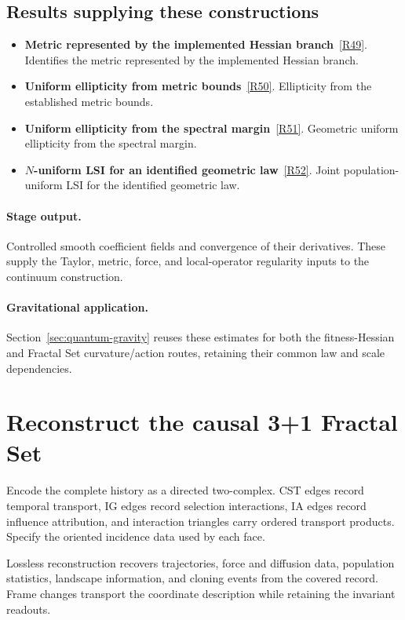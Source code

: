 \documentclass[11pt,a4paper]{article}
\begin{document}
\subsection*{Results supplying these constructions}
\begin{itemize}
\item \textbf{Metric represented by the implemented Hessian branch}~\hyperref[src:prop-geometry-clipped-metric]{[R49]}. Identifies the metric represented by the implemented Hessian branch.
\item \textbf{Uniform ellipticity from metric bounds}~\hyperref[src:thm-uniform-ellipticity-latent]{[R50]}. Ellipticity from the established metric bounds.
\item \textbf{Uniform ellipticity from the spectral margin}~\hyperref[src:thm-gg-ueph-construction]{[R51]}. Geometric uniform ellipticity from the spectral margin.
\item \textbf{\(N\)-uniform LSI for an identified geometric law}~\hyperref[src:thm-gg-lsi-main]{[R52]}. Joint population-uniform LSI for the identified geometric law.
\end{itemize}
\paragraph{Stage output.} Controlled smooth coefficient fields and convergence of their derivatives. These supply the Taylor, metric, force, and local-operator regularity inputs to the continuum construction.
\paragraph{Gravitational application.} Section~\ref{sec:quantum-gravity} reuses these estimates for both the fitness-Hessian and Fractal Set curvature/action routes, retaining their common law and scale dependencies.

\section{Reconstruct the causal 3+1 Fractal Set}
\label{stage:10}
Encode the complete history as a directed two-complex. CST edges record temporal transport, IG edges record selection interactions, IA edges record influence attribution, and interaction triangles carry ordered transport products. Specify the oriented incidence data used by each face.

Lossless reconstruction recovers trajectories, force and diffusion data, population statistics, landscape information, and cloning events from the covered record. Frame changes transport the coordinate description while retaining the invariant readouts.
\end{document}

